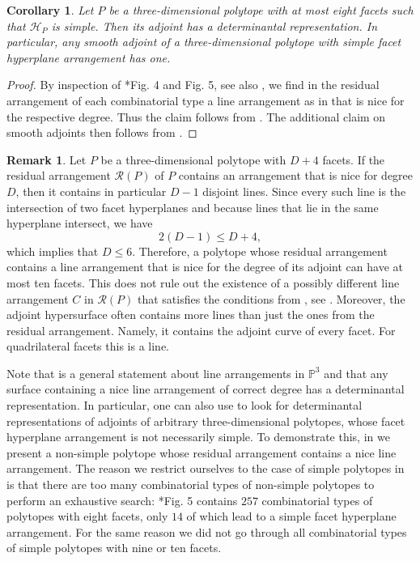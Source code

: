 \documentclass[a4paper,10pt]{amsart}
\theoremstyle{definition}
\newtheorem{rem}[Def]{Remark}
\theoremstyle{plain}
\newtheorem{cor}[Def]{Corollary}
\newcommand{\cH}{{\mathcal H}}
\newcommand{\cR}{{\mathcal R}}
\begin{document}
\begin{cor}\label{cor:smoothdetrep}
    Let $P$ be a three-dimensional polytope with at most eight facets such that $\cH_P$ is simple. Then its adjoint has a determinantal representation. In particular, any smooth adjoint of a three-dimensional polytope with simple facet hyperplane arrangement has one. 
\end{cor}

\begin{proof}
    By inspection of \cite{BrittonDunitz73Polytopes}*{Fig. 4 and Fig. 5}, see also , we find in the residual arrangement of each combinatorial type a line arrangement as in  that is nice for the respective degree. Thus the claim follows from .
    The additional claim on smooth adjoints then follows from .
\end{proof}

\begin{rem}
    Let $P$ be a three-dimensional polytope with $D+4$ facets. If the residual arrangement $\cR(P)$ of $P$ contains an arrangement that is nice for degree $D$, then it contains in particular $D-1$ disjoint lines. Since every such line is the intersection of two facet hyperplanes and because lines that lie in the same hyperplane intersect, we have
    \begin{equation*}
        2(D-1)\leq D+4,
    \end{equation*}
    which implies that $D\leq6$. Therefore, a polytope whose residual arrangement contains a line arrangement that is nice for the degree of its adjoint can have at most ten facets. This does not rule out the existence of a possibly different line arrangement $C$ in $\cR(P)$ that satisfies the conditions from , see . Moreover, the adjoint hypersurface often contains more lines than just the ones from the residual arrangement. Namely, it contains the adjoint curve of every facet. For quadrilateral facets this is a line.
\end{rem}

Note that  is a general statement about line arrangements in $\mathbb{P}^3$ and that any surface containing a nice line arrangement of correct degree has a determinantal representation. In particular, one can also use  to look for determinantal representations of adjoints of arbitrary three-dimensional polytopes, whose facet hyperplane arrangement is not necessarily simple. To demonstrate this, in  we present a non-simple polytope whose residual arrangement contains a nice line arrangement. The reason we restrict ourselves to the case of simple polytopes in  is that there are too many combinatorial types of non-simple polytopes to perform an exhaustive search: \cite{BrittonDunitz73Polytopes}*{Fig. 5} contains $257$ combinatorial types of polytopes with eight facets, only $14$ of which lead to a simple facet hyperplane arrangement. For the same reason we did not go through all combinatorial types of simple polytopes with nine or ten facets.
\end{document}
